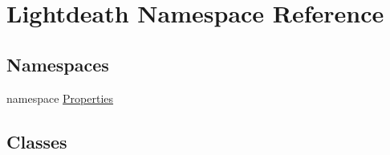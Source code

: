 \hypertarget{namespace_lightdeath}{}\section{Lightdeath Namespace Reference}
\label{namespace_lightdeath}
\subsection*{Namespaces}
\begin{DoxyCompactItemize}
\item 
namespace \hyperlink{namespace_lightdeath_1_1_properties}{Properties}
\end{DoxyCompactItemize}
\subsection*{Classes}
